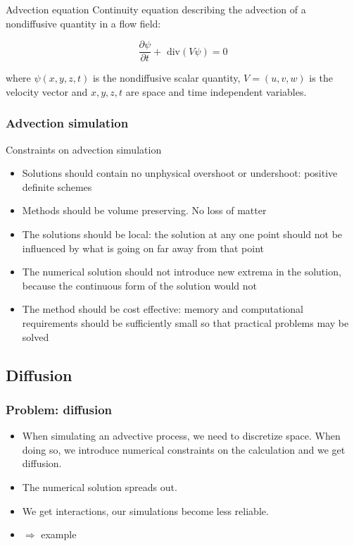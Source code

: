 \documentclass[hyperref={pdfstartview=Fit}]{beamer}
\begin{document}
\begin{frame}
\begin{block}{Advection equation}
Continuity equation describing the advection of a nondiffusive quantity in a flow field:

\begin{equation}
\frac{\partial \psi}{\partial t} + \text{ div}(V\psi) = 0
\end{equation}

where $\psi(x,y,z,t)$ is the nondiffusive scalar quantity, $V=(u,v,w)$ is the velocity vector and $x,y,z,t$ are space and time independent variables. 
\end{block}


\end{frame}

\begin{frame}
\frametitle{Advection simulation}

Constraints on advection simulation

\begin{itemize}
\item Solutions should contain no unphysical overshoot or undershoot: positive definite schemes
\item Methods should be volume preserving. No loss of matter
\item The solutions should be local: the solution at any one point should not be influenced by what is going on far away from that point
\item The numerical solution should not introduce new extrema in the solution, because the continuous form of the solution would not
\item The method should be cost effective: memory and computational requirements should be sufficiently small so that practical problems may be solved
\end{itemize}

\end{frame}

\subsection{Diffusion}
\begin{frame}
\frametitle{Problem: diffusion}

\begin{itemize}
\item When simulating an advective process, we need to discretize space. When doing so, we introduce numerical constraints on the calculation and we get diffusion.
\item The numerical solution spreads out.
\item We get interactions, our simulations become less reliable.
\item $\Longrightarrow$ example
\end{itemize}

\end{frame}
\end{document}
